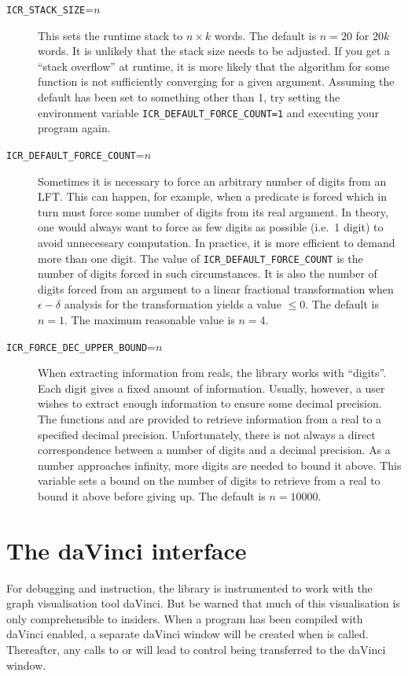 \documentclass[a4paper,12pt]{article}
\begin{document}
\begin{description}
\item[\texttt{ICR{\_}STACK{\_}SIZE}=$n$]
\quad This sets the runtime stack to
$n \times k$ words. The default is $n = 20$ for $20k$ words.
It is unlikely that the stack size needs to be adjusted.
If you get a ``stack overflow'' at runtime, it is more likely that the
algorithm for some function is not sufficiently converging for a given
argument. Assuming the default has been set to something other than 1,
try setting the
environment variable \texttt{ICR{\_}DEFAULT{\_}FORCE{\_}COUNT=1} and executing
your program again.
\item[\texttt{ICR{\_}DEFAULT{\_}FORCE{\_}COUNT}=$n$]
\quad Sometimes it
is necessary to force
an arbitrary number of digits from an LFT. This can happen, for example,
when a predicate is forced which in turn must force some number of digits
from its real argument. In theory, one would always want to force as
few digits as possible (i.e.\ 1 digit) 
to avoid unnecessary computation. In practice, it
is more efficient to demand more than one digit. The value
of \texttt{ICR{\_}DEFAULT{\_}FORCE{\_}COUNT}
is the number of digits forced in such
circumstances. It is also the number of digits forced from an argument
to a linear fractional transformation when $\epsilon-\delta$ analysis
for the transformation yields a value $\leq 0$. The default is $n = 1$.
The maximum reasonable value is $n = 4$.
\item[\texttt{ICR{\_}FORCE{\_}DEC{\_}UPPER{\_}BOUND}=$n$] 
\quad
When extracting information from reals, the library works with
``digits''. Each digit gives a fixed amount of information. Usually, however,
a user wishes to extract enough information to ensure some decimal precision.
The functions  and 
are provided to
retrieve information from a real to a specified decimal precision.
Unfortunately, there is not always a direct correspondence between a number of
digits and a decimal precision. As a number approaches infinity, more
digits are needed to bound it above. This variable sets a bound
on the number of digits to retrieve from a real to bound it above before
giving up.
The default is $n = 10000$.
\end{description}

\section{The daVinci interface}

For debugging and instruction, the library is instrumented to
work with the graph visualisation tool daVinci.
But be warned that much of this visualisation
is only comprehensible to insiders.
When a program has been compiled with daVinci enabled,
a separate daVinci window will be created
when  is called.
Thereafter, any calls to  or 
will lead to control being transferred to the daVinci window.
\end{document}
